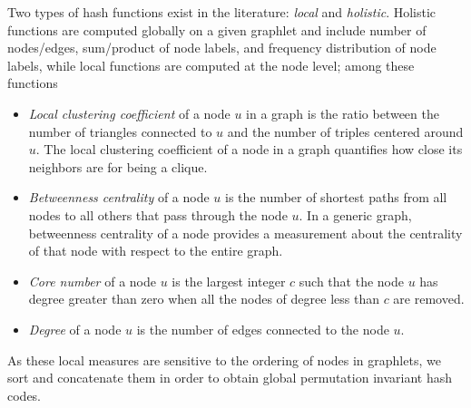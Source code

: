 \documentclass[journal]{IEEEtran}
\theoremstyle{definition}
\begin{document}
Two types of hash functions exist in the literature: \emph{local} and \emph{holistic}. Holistic functions are computed globally on a given graphlet and include number of nodes/edges, sum/product of node labels, and frequency distribution of node labels, while local functions are computed at the node level; among these functions
\begin{itemize}
\item \emph{Local clustering coefficient} of a node $u$ in a graph is the ratio between the number of triangles connected to $u$ and the number of triples centered around $u$. The local clustering coefficient of a node in a graph quantifies how close its neighbors are for being a clique.
\item \emph{Betweenness centrality} of a node $u$ is the number of shortest paths from all nodes to all others that pass through the node $u$. In a generic graph, betweenness centrality of a node provides a measurement about the centrality of that node with respect to the entire graph.
\item \emph{Core number} of a node $u$ is the largest integer $c$ such that the node $u$ has degree greater than zero when all the nodes of degree less than $c$ are removed.
\item \emph{Degree} of a node $u$ is the number of edges connected to the node $u$.
\end{itemize}
As these local measures are sensitive to the ordering of nodes in graphlets, we sort and concatenate them in order to obtain global permutation invariant hash codes.
\end{document}
